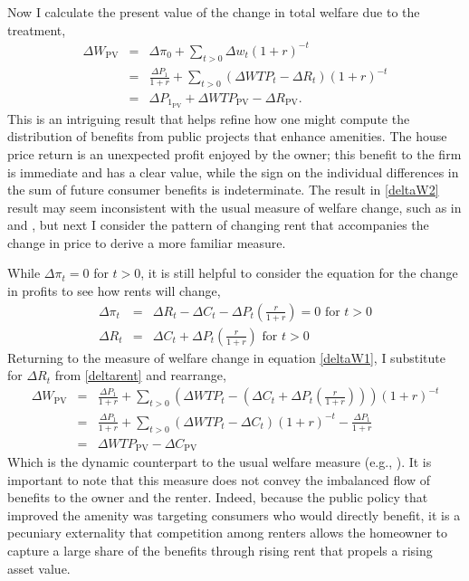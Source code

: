 \documentclass[ecta,nameyear,draft]{econsocart}
\theoremstyle{plain}
\theoremstyle{remark}
\begin{document}
Now I calculate the present value of the change in total welfare due to the treatment,
\begin{eqnarray}
	\Delta W_{\mathrm{PV}}&=&\Delta \pi_0+\sum_{t>0}\Delta w_t(1+r)^{-t}\nonumber\\
	&=&\frac{\Delta P_1}{1+r}+\sum_{t>0} (\Delta \mathit{WTP}_t-\Delta R_t)(1+r)^{-t} \label{deltaW1}\\
	&=&\Delta P_{1_{\mathrm{PV}}}+\Delta\mathit{WTP}_\mathrm{PV}-\Delta R_{\mathrm{PV}}.\label{deltaW2}
\end{eqnarray}
This is an intriguing result that helps refine how one might compute the distribution of benefits from public projects that enhance amenities. The house price return is an unexpected profit enjoyed by the owner; this benefit to the firm is immediate and has a clear value, while the sign on the individual differences in the sum of future consumer benefits is indeterminate. The result in \ref{deltaW2} result may seem inconsistent with the usual measure of welfare change, such as in \cite{freeman14} and \cite{banzhaf20}, but next I consider the pattern of changing rent that accompanies the change in price to derive a more familiar measure. 

While $\Delta\pi_t=0$ for $t>0$, it is still helpful to consider the equation for the change in profits to see how rents will change,
\begin{eqnarray}
	\Delta \pi_t &=& \Delta R_t-\Delta C_t-\Delta P_t\left(\frac{r}{1+r}\right)=0 \text{ for } t>0\nonumber\\
	\Delta R_t &=& \Delta C_t+\Delta P_t \left(\frac{r}{1+r}\right)  \text{ for } t>0\label{deltarent}
\end{eqnarray}
Returning to the measure of welfare change in equation \ref{deltaW1}, I substitute for $\Delta R_t$  from \ref{deltarent} and rearrange,
\begin{eqnarray}
	\Delta W_{\mathrm{PV}}&=&\frac{\Delta P_1}{1+r}+\sum_{t>0} \left(\Delta \mathit{WTP}_t-\left(\Delta C_t+\Delta P_t \left(\frac{r}{1+r}\right)\right)\right)(1+r)^{-t} \nonumber\\
	&=&\frac{\Delta P_1}{1+r}+\sum_{t>0} (\Delta \mathit{WTP}_t-\Delta C_t)(1+r)^{-t}-\frac{\Delta P_1}{1+r}\nonumber\\
	&=&\Delta \mathit{WTP}_{\mathrm{PV}}-\Delta C_{\mathrm{PV}}\nonumber %
\end{eqnarray}
Which is the dynamic counterpart to the usual welfare measure (e.g., \cite{freeman14}). It is important to note that this measure does not convey the imbalanced flow of benefits to the owner and the renter. Indeed, because the public policy that improved the amenity was targeting consumers who would directly benefit, it is a pecuniary externality that competition among renters allows the homeowner to capture a large share of the benefits through rising rent that propels a rising asset value.
\end{document}
